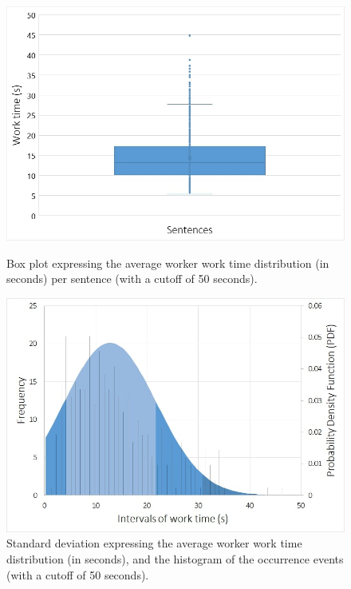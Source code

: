 \begin{figure}[H]
\centering
\begin{minipage}{0.48\textwidth}
\centering
\includegraphics[width=0.97\linewidth]{images/chapter_6/figure_4.jpg}
\caption[Box Plot Expressing the Average Worker Work Time Distribution]{Box plot expressing the average worker work time distribution (in seconds) per sentence (with a cutoff of 50 seconds).}\label{fig4}
\end{minipage}
\hfill
\begin{minipage}{0.48\textwidth}
\centering
\includegraphics[width=0.97\linewidth]{images/chapter_6/figure_5.jpg}
\caption[Standard Deviation Expressing the Average Worker Work Time Distribution]{Standard deviation expressing the average worker work time distribution (in seconds), and the histogram of the occurrence events (with a cutoff of 50 seconds).}\label{fig5}
\end{minipage}
\end{figure}


